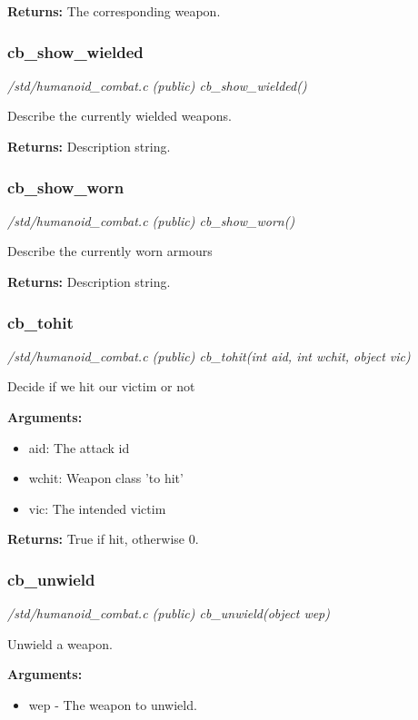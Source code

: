 {\bf Returns:}        The corresponding weapon.


\subsubsection{cb\_show\_wielded}

{\em /std/humanoid\_combat.c (public) cb\_show\_wielded()}

Describe the currently wielded weapons.

{\bf Returns:}        Description string.


\subsubsection{cb\_show\_worn}

{\em /std/humanoid\_combat.c (public) cb\_show\_worn()}

Describe the currently worn armours

{\bf Returns:}        Description string.


\subsubsection{cb\_tohit}

{\em /std/humanoid\_combat.c (public) cb\_tohit(int aid, int wchit, object vic)}

Decide if we hit our victim or not

{\bf Arguments:}
\begin{itemize}
\item      aid:   The attack id
\item wchit: Weapon class 'to hit'
\item vic:   The intended victim
\end{itemize}

{\bf Returns:}        True if hit, otherwise 0.


\subsubsection{cb\_unwield}

{\em /std/humanoid\_combat.c (public) cb\_unwield(object wep)}

Unwield a weapon.

{\bf Arguments:}
\begin{itemize}
\item     wep - The weapon to unwield.
\end{itemize}

